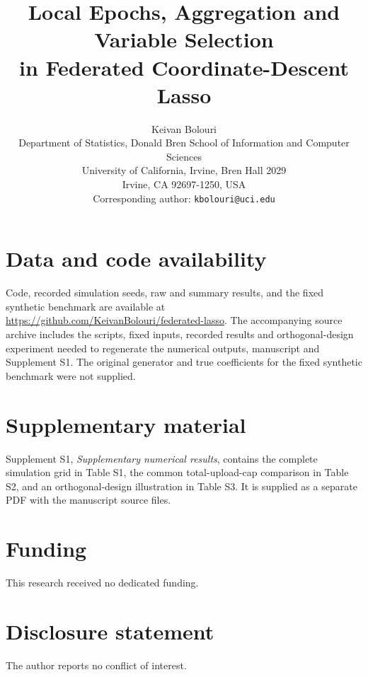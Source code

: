 \documentclass[11pt]{article}
\title{\bfseries Local Epochs, Aggregation and Variable Selection\\
in Federated Coordinate-Descent Lasso}
\author{Keivan Bolouri\\[2pt]
\small Department of Statistics, Donald Bren School of Information and Computer Sciences\\
\small University of California, Irvine, Bren Hall 2029\\
\small Irvine, CA 92697-1250, USA\\
\small Corresponding author: \texttt{kbolouri@uci.edu}}
\date{}
\theoremstyle{definition}
\begin{document}
\maketitle













\section*{Data and code availability}
Code, recorded simulation seeds, raw and summary results, and the fixed
synthetic benchmark are available at
\url{https://github.com/KeivanBolouri/federated-lasso}.
The accompanying source archive includes the scripts, fixed inputs,
recorded results and orthogonal-design experiment needed to regenerate
the numerical outputs, manuscript and Supplement S1. The original generator
and true coefficients for the fixed synthetic benchmark were not supplied.

\section*{Supplementary material}
Supplement S1, \emph{Supplementary numerical results}, contains the complete
simulation grid in Table S1, the common total-upload-cap comparison in
Table S2, and an orthogonal-design illustration in Table S3.
It is supplied as a separate PDF with the manuscript source files.

\section*{Funding}
This research received no dedicated funding.

\section*{Disclosure statement}
The author reports no conflict of interest.



\clearpage
\appendix

\end{document}

